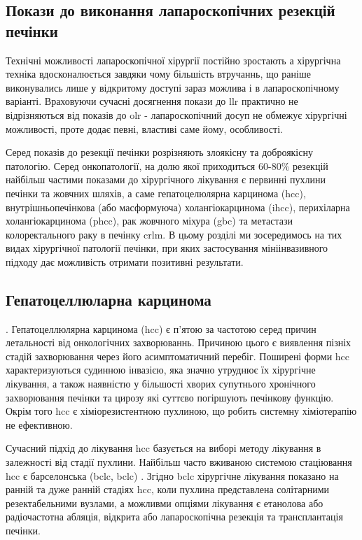 \begin{refsection}
\section{Покази до виконання лапароскопічних резекцій печінки}

Технічні можливості лапароскопічної хірургії постійно зростають а хірургічна техніка вдосконалюється завдяки чому більшість втручаннь, що раніше виконувались лише у відкритому доступі зараз можлива і в лапароскопічному варіанті. Враховуючи сучасні досягнення покази до \acrshort{llr} практично не відрізняються від показів до \acrshort{olr} - лапароскопічний досуп не обмежує хірургічні можливості, проте додає певні, властиві саме йому, особливості. 

Серед показів до резекції печінки розрізняють злоякісну та доброякісну патологію. Серед онкопатології, на долю якої приходиться 60-80\% резекцій  найбільш частими показами до хірургічного лікування є первинні пухлини печінки та жовчних шляхів, а саме гепатоцелюлярна карцинома (\acrshort{hcc}), внутрішньопечінкова (або масформуюча) холангіокарцинома (\acrshort{ihcc}), перихіларна холангіокарцинома (\acrshort{phcc}), рак жовчного міхура (\acrshort{gbc}) та метастази колоректального раку в печінку \acrshort{crlm}. 
В цьому розділі ми зосередимось на тих видах хірургічної патології печінки, при яких застосування мініінвазивного підходу дає можливість отримати позитивні результати. 

\subsection{Гепатоцеллюларна карцинома}.
Гепатоцеллюлярна карцинома (\acrshort{hcc}) є п'ятою за частотою серед причин летальності від онкологічних захворюваннь. Причиною цього є  виявлення пізніх стадій захворювання через його асимптоматичний перебіг. Поширені форми \acrshort{hcc} характеризуються судинною інвазією, яка значно утруднює їх хірургічне лікування, а також наявністю у більшості хворих супутнього хронічного захворювання печінки та цирозу які суттєво погіршують печінкову функцію. Окрім того \acrshort{hcc} є хіміорезистентною пухлиною, що робить системну хіміотерапію не ефективною.

Сучасний підхід до лікування \acrshort{hcc} базується на виборі методу лікування в залежності від стадії пухлини. Найбільш часто вживаною системою стаціювання \acrshort{hcc} є барселонська (\acrfull{bclc}, \acrshort{bclc}) \cite{Llovet2003}. Згідно \acrshort{bclc} хірургічне лікування показано на ранній та дуже ранній стадіях \acrshort{hcc}, коли пухлина представлена солітарними резектабельними вузлами, а можливми опціями лікування є етанолова або радіочастотна абляція, відкрита або лапароскопічна резекція та трансплантація печінки. 


\end{refsection}
